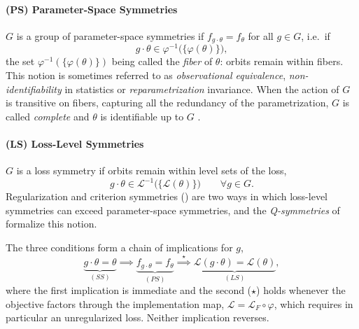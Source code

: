 \documentclass[mathematics,review,submit,moreauthors]{Definitions/mdpi}
\begin{document}
\paragraph{(PS) Parameter-Space Symmetries}\label{sec:PS_param-space-sym}
$G$ is a group of parameter-space symmetries if $f_{g\cdot\theta}=f_\theta$ for all $g\in G$, i.e.\ if
\begin{equation*}
    g\cdot\theta \in \varphi^{-1}\big(\{\varphi(\theta)\}\big),
\end{equation*}
the set $\varphi^{-1}(\{\varphi(\theta)\})$ being called the \emph{fiber} of $\theta$: orbits remain within fibers.
This notion is sometimes referred to as \emph{observational equivalence}, \emph{non-identifiability} in statistics or \emph{reparametrization} invariance.
When the action of $G$ is transitive on fibers, capturing all the redundancy of the parametrization, $G$ is called \emph{complete} and $\theta$ is identifiable up to $G$ \citep{zhao2025}.

\paragraph{(LS) Loss-Level Symmetries}
$G$ is a loss symmetry if orbits remain within level sets of the loss,
\begin{equation*}
    g\cdot\theta \in \mathcal{L}^{-1}\big(\{\mathcal{L}(\theta)\}\big) \qquad \forall g \in G.
\end{equation*} 
Regularization and criterion symmetries () are two ways in which loss-level symmetries can exceed parameter-space symmetries, and the \emph{Q-symmetries} of \citet{ziyin2024a} formalize this notion.

\vspace{3mm}

The three conditions form a chain of implications for $g$,
\begin{equation}\label{eq:param-symmetry-hierarchy}
    \underbrace{g\cdot\theta=\theta}_{(SS)} \implies \underbrace{f_{g\cdot\theta}=f_\theta}_{(PS)} \overset{\star}{\implies} \underbrace{\mathcal{L}(g\cdot\theta)=\mathcal{L}(\theta)}_{(LS)},
\end{equation}
where the first implication is immediate and the second ($\star$) holds whenever the objective factors through the implementation map, $\mathcal{L}=\mathcal{L}_F\circ\varphi$, which requires in particular an unregularized loss.
Neither implication reverses.
\end{document}
